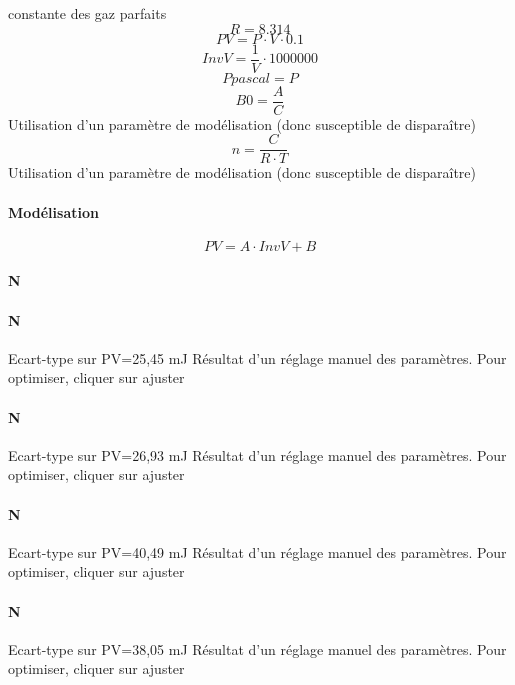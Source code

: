 \documentclass{scrreprt}
\title{}
\author{Sylvain}
\begin{document}
\maketitle
constante des gaz parfaits\newline
\[ R=8.314 \]
\[ PV=P\cdot V\cdot 0.1 \]
\[ InvV=\frac{1}{V}\cdot 1000000 \]
\[ Ppascal=P \]
\[ B0=\frac{A}{C} \]
Utilisation d'un paramètre de modélisation (donc susceptible de disparaître)\newline
\[ n=\frac{C}{R\cdot T} \]
Utilisation d'un paramètre de modélisation (donc susceptible de disparaître)\newline
\paragraph{Modélisation}
\[ PV=A\cdot InvV+B \]
\paragraph{N }
\paragraph{N }
Ecart-type sur PV=25,45 mJ\newline
Résultat d'un réglage manuel\newline
des paramètres. Pour optimiser,\newline
cliquer sur ajuster\newline
\paragraph{N }
Ecart-type sur PV=26,93 mJ\newline
Résultat d'un réglage manuel\newline
des paramètres. Pour optimiser,\newline
cliquer sur ajuster\newline
\paragraph{N }
Ecart-type sur PV=40,49 mJ\newline
Résultat d'un réglage manuel\newline
des paramètres. Pour optimiser,\newline
cliquer sur ajuster\newline
\paragraph{N }
Ecart-type sur PV=38,05 mJ\newline
Résultat d'un réglage manuel\newline
des paramètres. Pour optimiser,\newline
cliquer sur ajuster\newline
\end{document}
